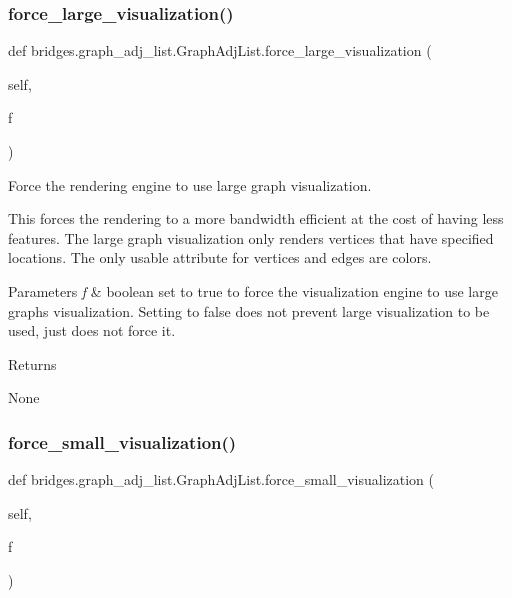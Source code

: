 \subsubsection{\texorpdfstring{force\+\_\+large\+\_\+visualization()}{force\_large\_visualization()}}
{\footnotesize\ttfamily def bridges.\+graph\+\_\+adj\+\_\+list.\+Graph\+Adj\+List.\+force\+\_\+large\+\_\+visualization (\begin{DoxyParamCaption}\item[{}]{self,  }\item[{}]{f }\end{DoxyParamCaption})}



Force the rendering engine to use large graph visualization. 

This forces the rendering to a more bandwidth efficient at the cost of having less features. The large graph visualization only renders vertices that have specified locations. The only usable attribute for vertices and edges are colors.


\begin{DoxyParams}{Parameters}
{\em f} & boolean set to true to force the visualization engine to use large graphs visualization. Setting to false does not prevent large visualization to be used, just does not force it. \\
\hline
\end{DoxyParams}
\begin{DoxyReturn}{Returns}


None 
\end{DoxyReturn}
\mbox{\label{classbridges_1_1graph__adj__list_1_1_graph_adj_list_a036b6368bf916474da748e96dd93ec5a}} 
\subsubsection{\texorpdfstring{force\+\_\+small\+\_\+visualization()}{force\_small\_visualization()}}
{\footnotesize\ttfamily def bridges.\+graph\+\_\+adj\+\_\+list.\+Graph\+Adj\+List.\+force\+\_\+small\+\_\+visualization (\begin{DoxyParamCaption}\item[{}]{self,  }\item[{}]{f }\end{DoxyParamCaption})}




